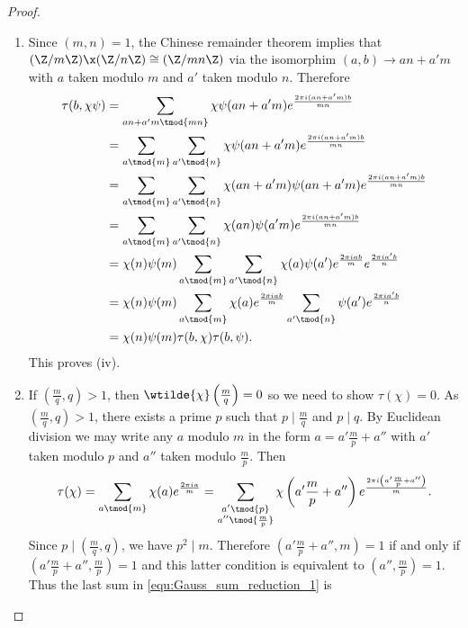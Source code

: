 \begin{proof}
\begin{enumerate}[label=(\roman*)]
            \item Since $(m,n) = 1$, the Chinese remainder theorem implies that $(\Z/m\Z) \x (\Z/n\Z) \cong (\Z/mn\Z)$ via the isomorphim $(a,b) \to an+a'm$ with $a$ taken modulo $m$ and $a'$ taken modulo $n$. Therefore
            \begin{align*}
              \tau(b,\chi\psi) &= \sum_{an+a'm \tmod{mn}}\chi\psi(an+a'm)e^{\frac{2\pi i(an+a'm)b}{mn}} \\
              &= \sum_{a\tmod{m}}\sum_{a'\tmod{n}}\chi\psi(an+a'm)e^{\frac{2\pi i(an+a'm)b}{mn}} \\
              &= \sum_{a\tmod{m}}\sum_{a'\tmod{n}}\chi(an+a'm)\psi(an+a'm)e^{\frac{2\pi i(an+a'm)b}{mn}} \\
              &= \sum_{a\tmod{m}}\sum_{a'\tmod{n}}\chi(an)\psi(a'm)e^{\frac{2\pi i(an+a'm)b}{mn}} \\
              &= \chi(n)\psi(m)\sum_{a\tmod{m}}\sum_{a'\tmod{n}}\chi(a)\psi(a')e^{\frac{2\pi iab}{m}}e^{\frac{2\pi ia'b}{n}} \\
              &= \chi(n)\psi(m)\sum_{a\tmod{m}}\chi(a)e^{\frac{2\pi iab}{m}}\sum_{a'\tmod{n}}\psi(a')e^{\frac{2\pi ia'b}{n}} \\
              &= \chi(n)\psi(m)\tau(b,\chi)\tau(b,\psi).
            \end{align*}
            This proves (iv).
            \item If $\left(\frac{m}{q},q\right) > 1$, then $\wtilde{\chi}\left(\frac{m}{q}\right) = 0$ so we need to show $\tau(\chi) = 0$. As $\left(\frac{m}{q},q\right) > 1$, there exists a prime $p$ such that $p \mid \frac{m}{q}$ and $p \mid q$. By Euclidean division we may write any $a$ modulo $m$ in the form $a = a'\frac{m}{p}+a''$ with $a'$ taken modulo $p$ and $a''$ taken modulo $\frac{m}{p}$. Then
            \begin{equation}\label{equ:Gauss_sum_reduction_1}
              \tau(\chi) = \sum_{a \tmod{m}}\chi(a)e^{\frac{2\pi ia}{m}} = \sum_{\substack{a' \tmod{p} \\ a'' \tmod{\frac{m}{p}}}}\chi\left(a'\frac{m}{p}+a''\right)e^{\frac{2\pi i\left(a'\frac{m}{p}+a''\right)}{m}}.
            \end{equation}
            Since $p \mid \left(\frac{m}{q},q\right)$, we have $p^{2} \mid m$. Therefore $\left(a'\frac{m}{p}+a'',m\right) = 1$ if and only if $\left(a'\frac{m}{p}+a'',\frac{m}{p}\right) = 1$ and this latter condition is equivalent to $\left(a'',\frac{m}{p}\right) = 1$. Thus the last sum in \cref{equ:Gauss_sum_reduction_1} is
            \[
\]
\end{enumerate}
\end{proof}
